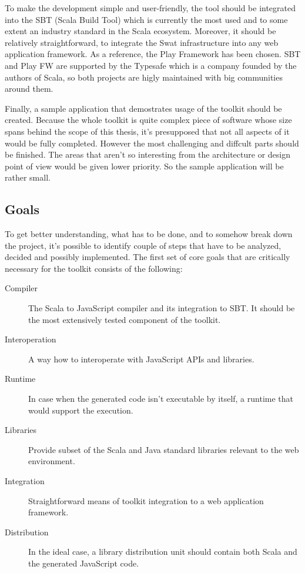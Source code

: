 \documentclass[12pt,a4paper]{report}
\begin{document}
To make the development simple and user-friendly, the tool should be integrated into the SBT (Scala Build Tool\cite{sbt}) which is currently the most used and to some extent an industry standard in the Scala ecosystem. Moreover, it should be relatively straightforward, to integrate the Swat infrastructure into any web application framework. As a reference, the Play Framework\cite{play} has been chosen. SBT and Play FW are supported by the Typesafe\cite{typesafe} which is a company founded by the authors of Scala, so both projects are higly maintained with big communities around them.

Finally, a sample application that demostrates usage of the toolkit should be created. Because the whole toolkit is quite complex piece of software whose size spans behind the scope of this thesis, it's presupposed that not all aspects of it would be fully completed. However the most challenging and diffcult parts should be finished. The areas that aren't so interesting from the architecture or design point of view would be given lower priority. So the sample application will be rather small.

\subsection{Goals}

To get better understanding, what has to be done, and to somehow break down the project, it's possible to identify couple of steps that have to be analyzed, decided and possibly implemented. The first set of core goals that are critically necessary for the toolkit consists of the following:

\begin{description}
\item[Compiler] The Scala to JavaScript compiler and its integration to SBT. It should be the most extensively tested component of the toolkit.
\item[Interoperation] A way how to interoperate with JavaScript APIs and libraries.
\item[Runtime] In case when the generated code isn't executable by itself, a runtime that would support the execution.
\item[Libraries] Provide subset of the Scala and Java standard libraries relevant to the web environment.
\item[Integration] Straightforward means of toolkit integration to a web application framework.
\item[Distribution] In the ideal case, a library distribution unit should contain both Scala and the generated JavaScript code.
\end{description}
\end{document}
